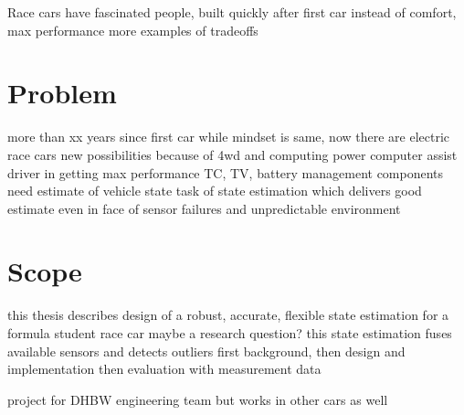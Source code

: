 Race cars have fascinated people, built quickly after first car
instead of comfort, max performance
more examples of tradeoffs

\section{Problem}
more than xx years since first car
while mindset is same, now there are electric race cars
new possibilities because of 4wd and computing power
computer assist driver in getting max performance
TC, TV, battery management
components need estimate of vehicle state
task of state estimation which delivers good estimate even in face of sensor failures and unpredictable environment

\section{Scope}
this thesis describes design of a robust, accurate, flexible state estimation for a formula student race car
maybe a research question?
this state estimation fuses available sensors and detects outliers
first background, then design and implementation
then evaluation with measurement data

project for DHBW engineering team but works in other cars as well
